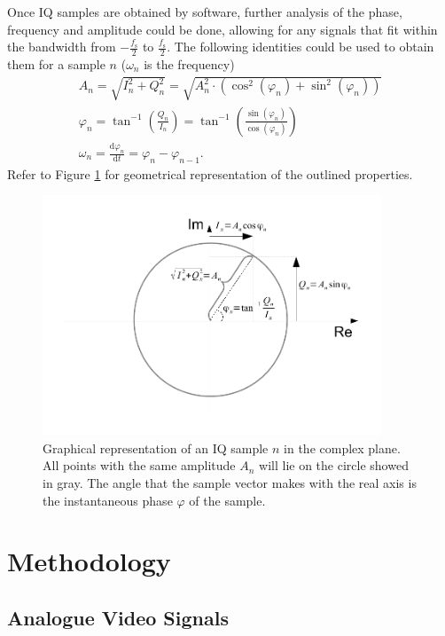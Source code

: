 \documentclass[a4paper,12pt,twoside,openright]{report}
\begin{document}
Once IQ samples are obtained by software, further analysis of the phase, frequency and amplitude could be done, allowing for any signals that fit within the bandwidth from $-\frac{f_\text{s}}{2}$ to $\frac{f_\text{s}}{2}$. The following identities could be used to obtain them for a sample $n$ ($\omega_{n}$ is the frequency)
\begin{subequations}
\begin{align}
A_{n} = \sqrt{I_n^2+Q_n^2} = \sqrt{A_{n}^2 \cdot (\cos^2(\varphi_n) + \sin^2(\varphi_n))} \\
\varphi_{n} = \tan^{-1}\left(\frac{Q_{n}}{I_{n}}\right) = \tan^{-1}\left(\frac{\sin(\varphi_{n})}{\cos(\varphi_{n})}\right) \\
\omega_{n} = \frac{\text{d} \varphi_{n}}{\text{d} t} = \varphi_{n} - \varphi_{n-1} .
\end{align}
\end{subequations}
Refer to Figure \ref{fig:IQ} for geometrical representation of the outlined properties.

\begin{figure}
\centering
\includegraphics[width=0.9\textwidth]{iqdrawing}
  \caption{Graphical representation of an IQ sample $n$ in the complex plane. All points with the same amplitude $A_{n}$ will lie on the circle showed in gray. The angle that the sample vector makes with the real axis is the instantaneous phase $\varphi$ of the sample.}
  \label{fig:IQ}
\end{figure}

\chapter{Methodology} 

\section{Analogue Video Signals}
\end{document}
